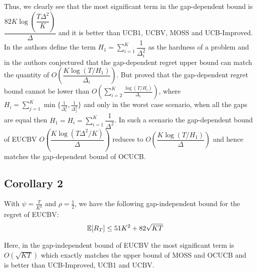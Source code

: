 Thus, we clearly see that the most significant term in the gap-dependent bound is $\dfrac{82K\log{(\dfrac{T\Delta^{2}}{ K})}}{\Delta}$ and it is better than UCB1, UCBV, MOSS and UCB-Improved. In \citet{audibert2010best} the authors define the term $H_1=\sum_{i=1}^{K}\dfrac{1}{\Delta_i^2}$ as the hardness of a problem and in \citet{bubeck2012regret} the authors conjectured that the gap-dependent regret upper bound can match the quantity of $O\left(\dfrac{K\log{(T/H_1)}}{\Delta_{i}}\right)$. But \citet{lattimore2015optimally} proved that the gap-dependent regret bound cannot be lower than $O\left(\sum_{i=2}^{K}\frac{\log\left(T/H_i\right)}{\Delta_i}\right)$, where $H_i=\sum_{j=1}^{K}\min\lbrace \frac{1}{\Delta_i^2},\frac{1}{\Delta_j^2}\rbrace$ and only in the worst case scenario, when all the gaps are equal then $H_1=H_{i}=\sum_{i=1}^{K}\dfrac{1}{\Delta^2}$. In such a scenario the gap-dependent bound of EUCBV $O\left(\dfrac{K\log{(T\Delta^{2}/ K)}}{\Delta}\right)$ reduces to $O\left(\dfrac{K\log{(T/H_1)}}{\Delta}\right)$ and hence matches the gap-dependent bound of OCUCB.

\subsection{Corollary 2}

\begin{corollary}
\label{Result:Corollary:2}
With $\psi=\frac{T}{K^2}$ and $\rho=\frac{1}{2}$, we have the following gap-independent bound for the regret of EUCBV:
\begin{align*}
\mathbb{E}[R_{T}] & \leq 51 K^2 + 82\sqrt{KT}
	\end{align*} 
\end{corollary}

Here, in the gap-independent bound of EUCBV the most significant term is $O\left(\sqrt{KT}\right)$ which exactly matches the upper bound of MOSS and OCUCB and is better than UCB-Improved, UCB1 and UCBV.